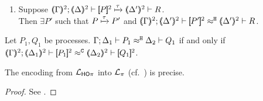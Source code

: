 \documentclass[runningheads]{llncs}
\begin{document}
{{\begin{proposition}
\begin{enumerate}[1.]
\begin{enumerate}[a)]
\begin{enumerate}[-]
					\item	%
						$
						\horel{\tmap{\Gamma}{2}}{\tmap{\Delta}{2}}{\pmap{P}{2}}
						{\hby{\tau}}
						{\tmap{\Delta'}{2}}{}{\newsp{\tilde{m}}{\pmap{P_1}{2} \Par \newsp{s}
						{\pmap{P_2}{2}\subst{\dual{s}}{x} \!\Par\! \binp{s}{y} \binp{y}{x} \pmap{Q}{2}}}}
						$, for some  $P_1, P_2, Q$;

					\item	%
						$\horel{\tmap{\Gamma}{2}}{\tmap{\Delta}{2}}{\pmap{P}{2}}
						{\hby{\tau}}
						{\tmap{\Delta'}{2}}{}{{\pmap{P'}{2} }}
						$

				\end{enumerate}
				\item 	If $\ell = \btau$ then 
						$\horel{\tmap{\Gamma}{2}}{\tmap{\Delta}{2}}{\pmap{P}{2}}
						{\hby{\stau}}
						{\tmap{\Delta'}{2}}{}{{\pmap{P'}{2} }}
						$.
				\end{enumerate}
		
		\item Suppose 
		$\stytra{\mapt{\Gamma}^{2}}{\tau}{\mapt{\Delta}^{2}}{\map{P}^{2}}{\mapt{\Delta'}^{2}}{R}$.  \\
		Then $\exists P'$ such that
					$P \xmapsto{\tau} P'$
					and $\horel{\mapt{\Gamma}^{2}}{\mapt{\Delta'}^{2}}{\map{P'}^{2}}{\hwb}{\mapt{\Delta'}^{2}}{R}$.
	\end{enumerate}
\end{proposition}


\begin{proposition}%
	\label{prop:fulla_HOp_to_p}
	Let $P_1, Q_1$ be \HOp processes.
	$\Gamma; \Delta_1 \vdash P_1 \approx^\mathtt{H} \Delta_2 \vdash Q_1$
	if and only if
	$\horel{\tmap{\Gamma}{2}}{\tmap{\Delta_1}{2}}{\pmap{P_1}{2}}{\fwb}{\tmap{\Delta_2}{2}}{\pmap{Q_1}{2}}$.
\end{proposition}




\begin{theorem}
\label{f:enc:hotopi}
The encoding from $\mathcal{L}_{\mathsf{HO}\pi}$ into $\mathcal{L}_{\pi}$ (cf.~)
is precise. 
\end{theorem}

\begin{proof}
See .
\end{proof}

}}
\end{document}
